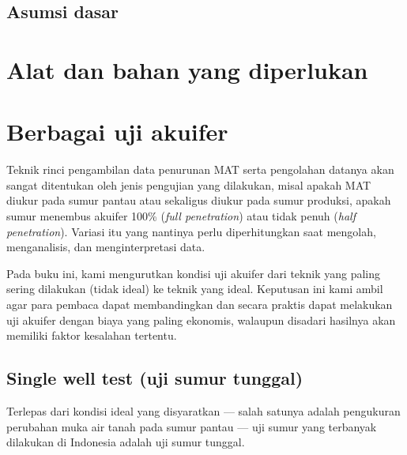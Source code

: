 \subsection{Asumsi dasar}



\section{Alat dan bahan yang diperlukan}





\section{Berbagai uji akuifer}

Teknik rinci pengambilan data penurunan MAT serta pengolahan datanya akan sangat ditentukan oleh jenis pengujian yang dilakukan, misal apakah MAT diukur pada sumur pantau atau sekaligus diukur pada sumur produksi, apakah sumur menembus akuifer 100\% (\textit{full penetration}) atau tidak penuh (\textit{half penetration}). Variasi itu yang nantinya perlu diperhitungkan saat mengolah, menganalisis, dan menginterpretasi data. 

Pada buku ini, kami mengurutkan kondisi uji akuifer dari teknik yang paling sering dilakukan (tidak ideal) ke teknik yang ideal. Keputusan ini kami ambil agar para pembaca dapat membandingkan dan secara praktis dapat melakukan uji akuifer dengan biaya yang paling ekonomis, walaupun disadari hasilnya akan memiliki faktor kesalahan tertentu.


\subsection{Single well test (uji sumur tunggal)}

Terlepas dari kondisi ideal yang disyaratkan — salah satunya adalah pengukuran perubahan muka air tanah pada sumur pantau — uji sumur yang terbanyak dilakukan di Indonesia adalah uji sumur tunggal.  
